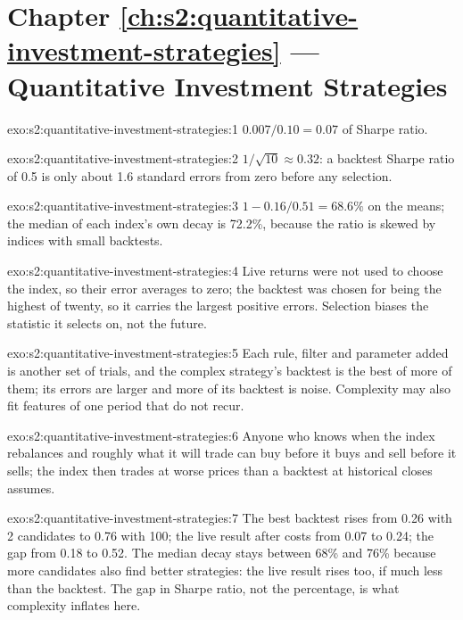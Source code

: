 \section*{Chapter \ref{ch:s2:quantitative-investment-strategies} --- Quantitative Investment Strategies}

\begin{solution}{exo:s2:quantitative-investment-strategies:1}
$0.007 / 0.10 = 0.07$ of Sharpe ratio.
\end{solution}

\begin{solution}{exo:s2:quantitative-investment-strategies:2}
$1/\sqrt{10} \approx 0.32$: a backtest Sharpe ratio of 0.5 is only about 1.6 standard errors from zero before any selection.
\end{solution}

\begin{solution}{exo:s2:quantitative-investment-strategies:3}
$1 - 0.16/0.51 = 68.6\%$ on the means; the median of each index's own decay is 72.2\%, because the ratio is skewed by indices with small backtests.
\end{solution}

\begin{solution}{exo:s2:quantitative-investment-strategies:4}
Live returns were not used to choose the index, so their error averages to zero; the backtest was chosen for being the highest of twenty, so it
carries the largest positive errors. Selection biases the statistic it selects on, not the future.
\end{solution}

\begin{solution}{exo:s2:quantitative-investment-strategies:5}
Each rule, filter and parameter added is another set of trials, and the complex strategy's backtest is the best of more of them; its errors are
larger and more of its backtest is noise. Complexity may also fit features of one period that do not recur.
\end{solution}

\begin{solution}{exo:s2:quantitative-investment-strategies:6}
Anyone who knows when the index rebalances and roughly what it will trade can buy before it buys and sell before it sells; the index then trades at
worse prices than a backtest at historical closes assumes.
\end{solution}

\begin{solution}{exo:s2:quantitative-investment-strategies:7}
The best backtest rises from 0.26 with 2 candidates to 0.76 with 100; the live result after costs from 0.07 to 0.24; the gap from 0.18 to 0.52. The
median decay stays between 68\% and 76\% because more candidates also find better strategies: the live result rises too, if much less than the
backtest. The gap in Sharpe ratio, not the percentage, is what complexity inflates here.
\end{solution}

